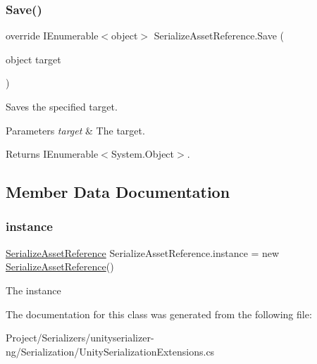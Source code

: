 \subsubsection{\texorpdfstring{Save()}{Save()}}
{\footnotesize\ttfamily override I\+Enumerable$<$object$>$ Serialize\+Asset\+Reference.\+Save (\begin{DoxyParamCaption}\item[{object}]{target }\end{DoxyParamCaption})\hspace{0.3cm}{\ttfamily [inline]}}



Saves the specified target. 


\begin{DoxyParams}{Parameters}
{\em target} & The target.\\
\hline
\end{DoxyParams}
\begin{DoxyReturn}{Returns}
I\+Enumerable$<$System.\+Object$>$.
\end{DoxyReturn}


\subsection{Member Data Documentation}
\mbox{\label{class_serialize_asset_reference_ad34320b9b2fc2e39a5c4e8addb07e5ec}} 
\subsubsection{\texorpdfstring{instance}{instance}}
{\footnotesize\ttfamily \hyperlink{class_serialize_asset_reference}{Serialize\+Asset\+Reference} Serialize\+Asset\+Reference.\+instance = new \hyperlink{class_serialize_asset_reference}{Serialize\+Asset\+Reference}()\hspace{0.3cm}{\ttfamily [static]}}



The instance 



The documentation for this class was generated from the following file\+:\begin{DoxyCompactItemize}
\item 
Project/\+Serializers/unityserializer-\/ng/\+Serialization/Unity\+Serialization\+Extensions.\+cs\end{DoxyCompactItemize}
